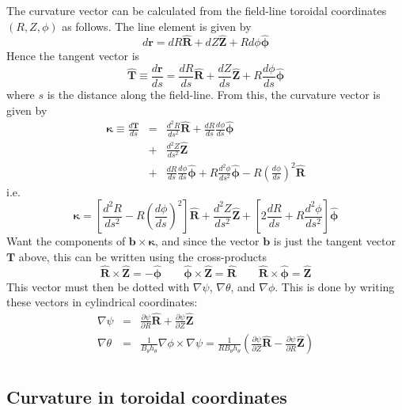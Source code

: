 \documentclass[12pt, a4paper]{article}
\newcommand{\dd}[2]{\ensuremath{\frac{d #1}{d #2}}}
\newcommand{\ddd}[2]{\ensuremath{\frac{d^2 #1}{d #2^2}}}
\newcommand{\deriv}[2]{\ensuremath{\frac{\partial #1}{\partial #2}}}
\newcommand{\hthe}{\ensuremath{h_\theta}}
\newcommand{\Bp}{\ensuremath{B_\theta}}
\newcommand{\Vec}[1]{\ensuremath{\mathbf{#1}}}
\newcommand{\kvec}{\Vec{\kappa}}
\newcommand{\Rvec}{\ensuremath{\hat{\Vec{R}}}}
\newcommand{\Zvec}{\ensuremath{\hat{\Vec{Z}}}}
\newcommand{\phivec}{\ensuremath{\hat{\Vec{\phi}}}}
\begin{document}
The curvature vector can be calculated from the field-line toroidal
coordinates $\left(R,Z,\phi\right)$ as follows. The line element
is given by
\[
d\Vec{r} = dR\Rvec + dZ\Zvec + Rd\phi\phivec
\]
Hence the tangent vector is
\[
\hat{\Vec{T}} \equiv \dd{\Vec{r}}{s} = \dd{R}{s}\Rvec + \dd{Z}{s}\Zvec + R\dd{\phi}{s}\phivec
\]
where $s$ is the distance along the field-line. From this, the curvature vector
is given by
\begin{eqnarray*}
\kvec \equiv \dd{\Vec{T}}{s} &=& \ddd{R}{s}\Rvec + \dd{R}{s}\dd{\phi}{s}\phivec \\
&+& \ddd{Z}{s}\Zvec \\
&+& \dd{R}{s}\dd{\phi}{s}\phivec + R\ddd{\phi}{s}\phivec - R\left(\dd{\phi}{s}\right)^2 \Rvec
\end{eqnarray*}
i.e.
\begin{equation}
\kvec = \left[\ddd{R}{s} - R\left(\dd{\phi}{s}\right)^2\right]\Rvec + \ddd{Z}{s}\Zvec + \left[2\dd{R}{s} + R\ddd{\phi}{s}\right]\phivec
\label{eq:kappaline}
\end{equation}
Want the components of $\Vec{b}\times\kvec$, and since the vector $\Vec{b}$
is just the tangent vector $\Vec{T}$ above, this can be written using the
cross-products
\[
\Rvec\times\Zvec = -\phivec \qquad \phivec\times\Zvec = \Rvec \qquad \Rvec\times\phivec = \Zvec
\]
This vector must then be dotted with $\nabla\psi$, $\nabla\theta$, and $\nabla\phi$. This is done by writing these vectors in cylindrical coordinates:
\begin{eqnarray*}
\nabla\psi &=& \deriv{\psi}{R}\hat{\Vec{R}} + \deriv{\psi}{Z}\hat{\Vec{Z}} \\
\nabla\theta &=& \frac{1}{\Bp\hthe}\nabla\phi\times\nabla\psi = \frac{1}{R\Bp\hthe}\left(\deriv{\psi}{Z}\hat{\Vec{R}} - \deriv{\psi}{R}\hat{\Vec{Z}}\right) \\
\end{eqnarray*}

\subsection{Curvature in toroidal coordinates}
\end{document}
